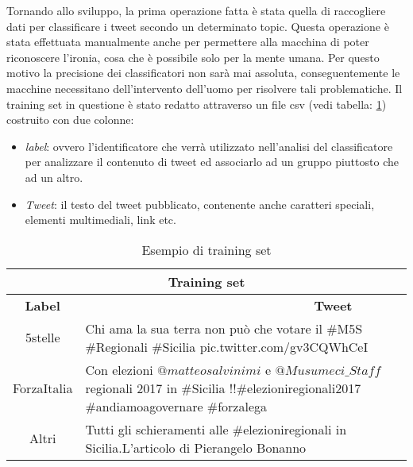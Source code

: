 Tornando allo sviluppo, la prima operazione fatta è stata quella di raccogliere dati per classificare i tweet secondo un determinato topic. Questa operazione è stata effettuata manualmente anche per permettere alla macchina di poter riconoscere l'ironia, cosa che è possibile solo per la mente umana. Per questo motivo la precisione dei classificatori non sarà mai assoluta, conseguentemente le macchine necessitano dell'intervento dell'uomo per risolvere tali problematiche. Il training set in questione è stato redatto attraverso un file csv (vedi tabella: \ref{training}) costruito con due colonne:
\begin{itemize}
\item \textit{label}: ovvero l'identificatore che verrà utilizzato nell'analisi del classificatore per analizzare il contenuto di tweet ed associarlo ad un gruppo piuttosto che ad un altro.
\item \textit{Tweet}: il testo del tweet pubblicato, contenente anche caratteri speciali, elementi multimediali, link etc.
\end{itemize}
\begin{table}[!htb]
\centering

\begin{tabular}{ |c|p{12cm}| }
 \hline
 \multicolumn{2}{|c|}{\textbf{Training set}} \\
 \hline 
 
 \textbf{Label}
  & 
 \ \ \ \ \ \ \ \ \ \ \ \ \ \ \ \ \ \ \ \ \ \ \ \ \ \ \ \ \ \ \ \ \ \ \ \ \textbf{Tweet}
 \\
 \hline
 5stelle   & Chi ama la sua terra non può che votare il \#M5S \#Regionali \#Sicilia pic.twitter.com/gv3CQWhCeI   \\ \hline
 ForzaItalia &   Con elezioni $ @matteosalvinimi$ e $@Musumeci\_Staff$ regionali 2017 in \#Sicilia !!\#elezioniregionali2017 \#andiamoagovernare \#forzalega  \\ \hline
Altri & Tutti gli schieramenti alle \#elezioniregionali in Sicilia.L'articolo di Pierangelo Bonanno \\
 \hline
\end{tabular}

\caption{Esempio di training set}
\label{training}
\end{table}

